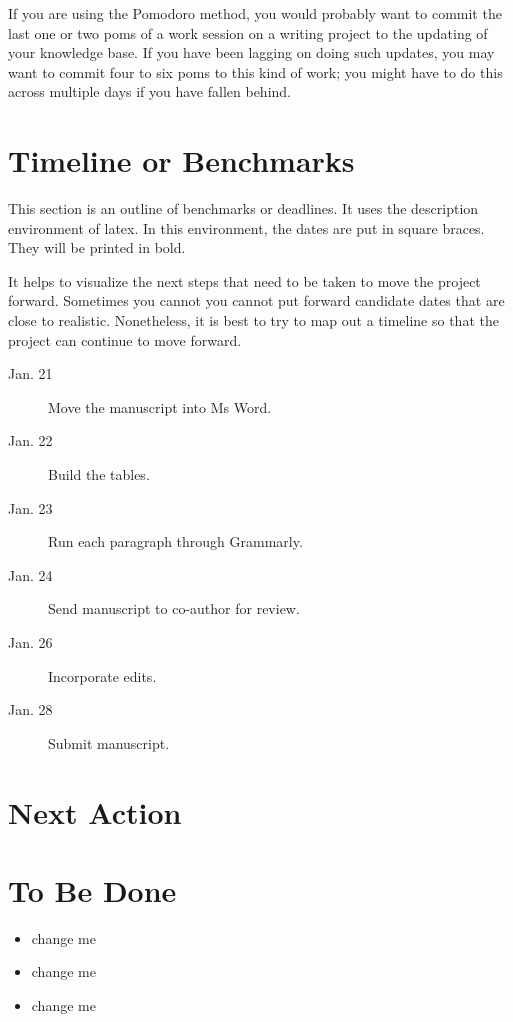 \documentclass[10pt,letterpaper]{article}
\begin{document}
If you are using the Pomodoro method, you would probably want to commit the last one or two poms of a work session on a writing project to the updating of your knowledge base.
If you have been lagging on doing such updates, you may want to commit four to six poms to this kind of work; you might have to do this across multiple days if you have fallen behind.


\section{Timeline or Benchmarks}
This section is an outline of benchmarks or deadlines.
It uses the description environment of latex.
In this environment, the dates are put in square braces.
They will be printed in bold.

It helps to visualize the next steps that need to be taken to move the project forward.
Sometimes you cannot you cannot put forward candidate dates that are close to realistic.
Nonetheless, it is best to try to map out a timeline so that the project can continue to move forward.

\begin{description}
\item [Jan. 21] Move the manuscript into Ms Word.
\item [Jan. 22] Build the tables.
\item [Jan. 23] Run each paragraph through Grammarly.
\item [Jan. 24] Send manuscript to co-author for review.
\item [Jan. 26] Incorporate edits.
\item [Jan. 28] Submit manuscript. 
\end{description}



\section{Next Action}


\section{To Be Done}

\begin{itemize}
  \item change me
  \item change me
  \item change me
\end{itemize}
\end{document}
